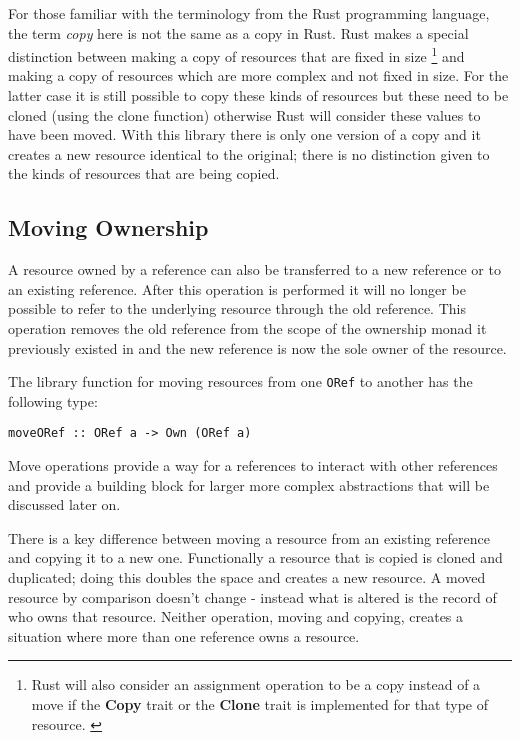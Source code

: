 \documentclass[onehalf,11pt]{beavtex}
\begin{document}
For those familiar with the terminology from the Rust programming language, the
term \textit{copy} here is not the same as a copy in Rust. Rust makes a special
distinction between making a copy of resources that are fixed in size
\footnote{Rust will also consider an assignment operation to be a copy instead
  of a move if the \textbf{Copy} trait or the \textbf{Clone} trait is
  implemented for that type of resource. \cite{rust_book_traits}
  \cite{rust_docs_clone_trait}}
and making a copy of resources which are more complex and not fixed in size.
For the latter case it is still possible to copy these kinds of resources but these
need to be cloned (using the clone function) otherwise Rust will consider these
values to have been moved. \cite{rust_book_ownership}
With this library there is only one version of a copy and it creates a new
resource identical to the original; there is no distinction given to the kinds
of resources that are being copied.

\subsection{Moving Ownership}

A resource owned by a reference can also be transferred to a new reference or
to an existing reference. After this operation is performed it will no longer
be possible to refer to the underlying resource through the old reference. This
operation removes the old reference from the scope of the ownership monad it
previously existed in and the new reference is now the sole owner of the
resource.

The library function for moving resources from one \texttt{ORef} to another has
the following type:

\begin{verbatim}
moveORef :: ORef a -> Own (ORef a)
\end{verbatim}

Move operations provide a way for a references to interact with
other references and provide a building block for larger more complex
abstractions that will be discussed later on.

There is a key difference between moving a resource from an existing reference
and copying it to a new one.  Functionally a resource that is copied is cloned
and duplicated; doing this doubles the space and creates a new resource.
A moved resource by comparison doesn't change - instead what is altered is the
record of who owns that resource.  Neither operation, moving and copying,
creates a situation where more than one reference owns a resource.
\end{document}
